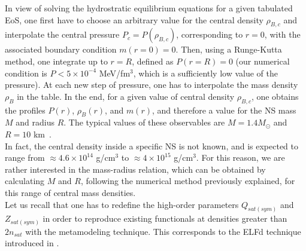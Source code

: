 In view of solving the hydrostratic equilibrium equations for a given tabulated 
EoS, one first have to choose an arbitrary value for the central density 
$\rho_{B,c}$ and 
interpolate the central pressure $P_c = P(\rho_{B,c})$, corresponding to $r=0$, 
with the associated boundary condition $m(r=0) = 0$. Then, using a Runge-Kutta 
method, one integrate up to $r=R$, defined as $P(r=R) = 0$ (our numerical 
condition is $P < 5\times 10^{-4}$ MeV/fm$^{3}$, which is a sufficiently low 
value of the pressure). At each new step of pressure, one has to interpolate 
the mass density $\rho_B$ in the table. In the end, for a given value of 
central density $\rho_{B,c}$, one obtains the profiles $P(r)$, $\rho_B(r)$, 
and $m(r)$, and therefore a value for the NS mass $M$ and radius $R$. The 
typical values of these observables are $M=1.4M_\odot$ and $R=10$ 
km~\cite{Haensel2007}.\\
In fact, the central density inside a specific NS is not known, and is expected
to range from $\approx 4.6\times 10^{14}$ g/cm$^3$ to $\approx 4\times 10^{15}$
g/cm$^3$. For this reason, we are rather interested in the mass-radius 
relation, which can be obtained by calculating $M$ and $R$, following the 
numerical method previously explained, for this range of central mass 
densities.\\
Let us recall that one has to redefine the high-order parameters $Q_{sat(sym)}$ 
and $Z_{sat(sym)}$ in order to reproduce existing functionals at densities
greater than $2n_{sat}$ with the metamodeling technique. This corresponds to
the ELFd technique introduced in \cite{Margueron2018a}.

